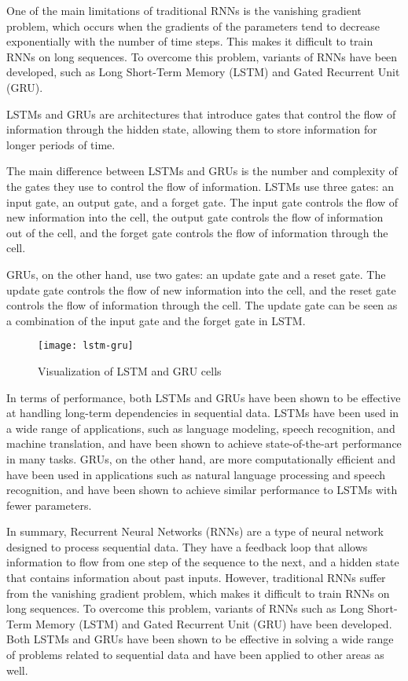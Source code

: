 One of the main limitations of traditional RNNs is the vanishing gradient problem, which occurs when the gradients of the parameters tend to decrease exponentially with the number of time steps.
This makes it difficult to train RNNs on long sequences.
To overcome this problem, variants of RNNs have been developed, such as Long Short-Term Memory (LSTM) and Gated Recurrent Unit (GRU).

LSTMs and GRUs are architectures that introduce gates that control the flow of information through the hidden state, allowing them to store information for longer periods of time. 

The main difference between LSTMs and GRUs is the number and complexity of the gates they use to control the flow of information.
LSTMs use three gates: an input gate, an output gate, and a forget gate.
The input gate controls the flow of new information into the cell, the output gate controls the flow of information out of the cell, and the forget gate controls the flow of information through the cell.

GRUs, on the other hand, use two gates: an update gate and a reset gate.
The update gate controls the flow of new information into the cell, and the reset gate controls the flow of information through the cell.
The update gate can be seen as a combination of the input gate and the forget gate in LSTM.

\begin{figure}[H]
  \centering
  \texttt{[image: lstm-gru]}
  \caption{Visualization of LSTM and GRU cells \cite{phi}}
\end{figure}

In terms of performance, both LSTMs and GRUs have been shown to be effective at handling long-term dependencies in sequential data.
LSTMs have been used in a wide range of applications, such as language modeling, speech recognition, and machine translation, and have been shown to achieve state-of-the-art performance in many tasks.
GRUs, on the other hand, are more computationally efficient and have been used in applications such as natural language processing and speech recognition, and have been shown to achieve similar performance to LSTMs with fewer parameters.

In summary, Recurrent Neural Networks (RNNs) are a type of neural network designed to process sequential data.
They have a feedback loop that allows information to flow from one step of the sequence to the next, and a hidden state that contains information about past inputs.
However, traditional RNNs suffer from the vanishing gradient problem, which makes it difficult to train RNNs on long sequences.
To overcome this problem, variants of RNNs such as Long Short-Term Memory (LSTM) and Gated Recurrent Unit (GRU) have been developed. Both LSTMs and GRUs have been shown to be effective in solving a wide range of problems related to sequential data and have been applied to other areas as well.

